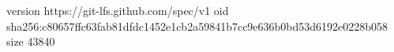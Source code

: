 version https://git-lfs.github.com/spec/v1
oid sha256:c80657ffc63fab81dfdc1452e1cb2a59841b7cc9e636b0bd53d6192e0228b058
size 43840
